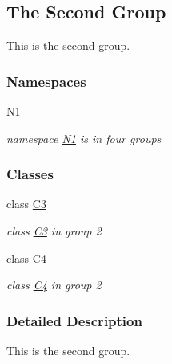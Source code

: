 \hypertarget{group__group2}{}\subsection{The Second Group}
\label{group__group2}


This is the second group.  


\subsubsection*{Namespaces}
\begin{DoxyCompactItemize}
\item 
 \hyperlink{namespace_n1}{N1}
\begin{DoxyCompactList}\small\item\em namespace \hyperlink{namespace_n1}{N1} is in four groups \end{DoxyCompactList}\end{DoxyCompactItemize}
\subsubsection*{Classes}
\begin{DoxyCompactItemize}
\item 
class \hyperlink{class_c3}{C3}
\begin{DoxyCompactList}\small\item\em class \hyperlink{class_c3}{C3} in group 2 \end{DoxyCompactList}\item 
class \hyperlink{class_c4}{C4}
\begin{DoxyCompactList}\small\item\em class \hyperlink{class_c4}{C4} in group 2 \end{DoxyCompactList}\end{DoxyCompactItemize}


\subsubsection{Detailed Description}
This is the second group. 

